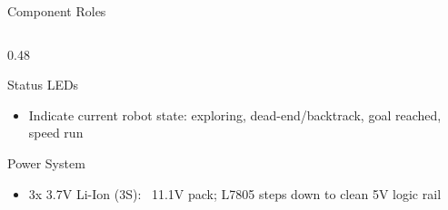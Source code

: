 \documentclass[aspectratio=169,11pt]{beamer}
\begin{document}
\begin{frame}[t]{Component Roles}
\begin{columns}[T]
\begin{column}{0.48\textwidth}
            \begin{block}{Status LEDs}
                \begin{itemize}\setlength{\itemsep}{0pt}\setlength{\parskip}{0pt}
                    \item Indicate current robot state: exploring, dead-end/backtrack, goal reached, speed run
                \end{itemize}
            \end{block}

            \begin{block}{Power System}
                \begin{itemize}\setlength{\itemsep}{0pt}\setlength{\parskip}{0pt}
                    \item 3x 3.7V Li-Ion (3S): ~11.1V pack; L7805 steps down to clean 5V logic rail
                \end{itemize}
            \end{block}
        \end{column}
    \end{columns}
\end{frame}
\end{document}
